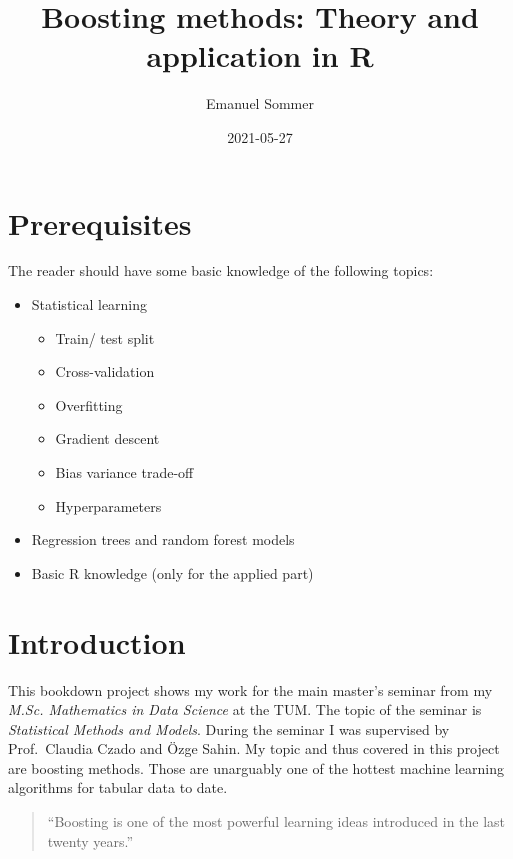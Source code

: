 \documentclass[
]{book}
\title{Boosting methods: Theory and application in R}
\author{Emanuel Sommer}
\date{2021-05-27}
\begin{document}
\maketitle

{
\setcounter{tocdepth}{1}
\tableofcontents
}
\hypertarget{prerequisites}{%
\chapter{Prerequisites}\label{prerequisites}}

The reader should have some basic knowledge of the following topics:

\begin{itemize}
\item
  Statistical learning

  \begin{itemize}
  \item
    Train/ test split
  \item
    Cross-validation
  \item
    Overfitting
  \item
    Gradient descent
  \item
    Bias variance trade-off
  \item
    Hyperparameters
  \end{itemize}
\item
  Regression trees and random forest models
\item
  Basic R knowledge (only for the applied part)
\end{itemize}

\hypertarget{intro}{%
\chapter{Introduction}\label{intro}}

This bookdown project shows my work for the main master's seminar from my \emph{M.Sc. Mathematics in Data Science} at the TUM. The topic of the seminar is \emph{Statistical Methods and Models}. During the seminar I was supervised by Prof.~Claudia Czado and Özge Sahin. My topic and thus covered in this project are boosting methods. Those are unarguably one of the hottest machine learning algorithms for tabular data to date.

\begin{quote}
``Boosting is one of the most powerful learning ideas introduced in the last
twenty years.'' \citep{elements}
\end{quote}
\end{document}
